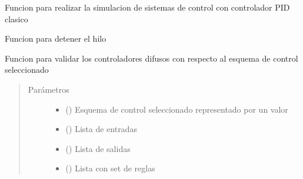 \documentclass[letterpaper,10pt,spanish]{sphinxmanual}
\begin{document}
\begin{fulllineitems}
\begin{fulllineitems}
\label{\detokenize{codigos/rutinas_simulacion:rutinas_simulacion.SimpleThread.run_pid}}
Funcion para realizar la simulacion de sistemas de control con controlador PID clasico

\end{fulllineitems}


\begin{fulllineitems}
\label{\detokenize{codigos/rutinas_simulacion:rutinas_simulacion.SimpleThread.stop}}
Funcion para detener el hilo

\end{fulllineitems}


\end{fulllineitems}


\begin{fulllineitems}
\label{\detokenize{codigos/rutinas_simulacion:rutinas_simulacion.controlador_validator}}
Funcion para validar los controladores difusos con respecto al esquema de control seleccionado
\begin{quote}\begin{description}
\item[{Parámetros}] \leavevmode\begin{itemize}
\item {} 
 () \textendash{} Esquema de control seleccionado representado por un valor

\item {} 
 () \textendash{} Lista de entradas

\item {} 
 () \textendash{} Lista de salidas

\item {} 
 () \textendash{} Lista con set de reglas

\end{itemize}

\end{description}\end{quote}

\end{fulllineitems}
\end{document}
